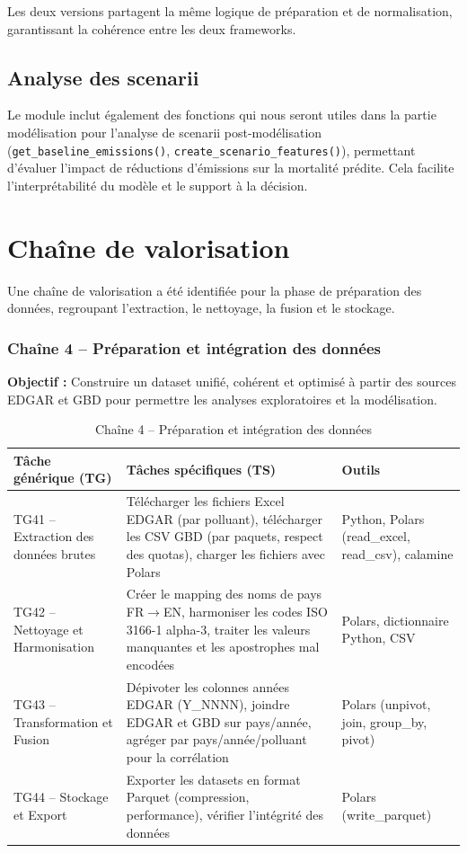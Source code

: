 \documentclass[11pt,a4paper]{article}
\begin{document}
Les deux versions partagent la même logique de préparation et de normalisation, garantissant la cohérence entre les deux frameworks.

\subsection{Analyse des scenarii}

Le module inclut également des fonctions qui nous seront utiles dans la partie modélisation pour l'analyse de scenarii post-modélisation (\lstinline{get_baseline_emissions()}, \lstinline{create_scenario_features()}), permettant d'évaluer l'impact de réductions d'émissions sur la mortalité prédite. Cela facilite l'interprétabilité du modèle et le support à la décision.

\clearpage

\section{Chaîne de valorisation}

Une chaîne de valorisation a été identifiée pour la phase de préparation des données, regroupant l'extraction, le nettoyage, la fusion et le stockage.

\subsubsection{Chaîne 4 -- Préparation et intégration des données}

\textbf{Objectif :} Construire un dataset unifié, cohérent et optimisé à partir des sources EDGAR et GBD pour permettre les analyses exploratoires et la modélisation.

\begin{table}[H]
\centering
\caption{Chaîne 4 -- Préparation et intégration des données}
\begin{tabular}{p{3.5cm}p{5.5cm}p{4.5cm}}
\toprule
\textbf{Tâche générique (TG)} & \textbf{Tâches spécifiques (TS)} & \textbf{Outils} \\
\midrule
TG41 -- Extraction des données brutes & Télécharger les fichiers Excel EDGAR (par polluant), télécharger les CSV GBD (par paquets, respect des quotas), charger les fichiers avec Polars & Python, Polars (read\_excel, read\_csv), calamine \\
\midrule
TG42 -- Nettoyage et Harmonisation & Créer le mapping des noms de pays FR$\rightarrow$EN, harmoniser les codes ISO 3166-1 alpha-3, traiter les valeurs manquantes et les apostrophes mal encodées & Polars, dictionnaire Python, CSV \\
\midrule
TG43 -- Transformation et Fusion & Dépivoter les colonnes années EDGAR (Y\_NNNN), joindre EDGAR et GBD sur pays/année, agréger par pays/année/polluant pour la corrélation & Polars (unpivot, join, group\_by, pivot) \\
\midrule
TG44 -- Stockage et Export & Exporter les datasets en format Parquet (compression, performance), vérifier l'intégrité des données & Polars (write\_parquet) \\
\bottomrule
\end{tabular}
\end{table}
\end{document}
